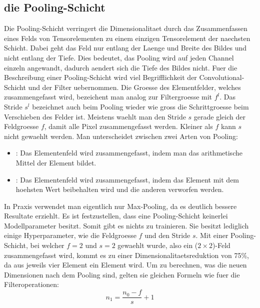 \subsection{die Pooling-Schicht}
Die Pooling-Schicht verringert die Dimensionalitaet durch das Zusammenfassen eines Felds
von Tensorelementen zu einem einzigen Tensorelement der naechsten Schicht.
Dabei geht das Feld nur entlang der Laenge und Breite des Bildes und
nicht entlang der Tiefe. Dies bedeutet, das Pooling wird auf jeden Channel
einzeln angewandt, dadurch aendert sich die Tiefe des Bildes nicht.
\para{}
Fuer die Beschreibung einer Pooling-Schicht wird viel Begrifflichkeit der
Convolutional-Schicht und der Filter uebernommen.
Die Groesse des Elementfelder, welches zusammengefasst wird, bezeichent man analog zur
Filtergroesse mit $f^l$. Das Stride $s^l$ bezeichnet auch beim Pooling wieder wie
gross die Schrittgroesse beim Verschieben des Felder ist. Meistens waehlt man den
Stride $s$ gerade gleich der Feldgroesse $f$, damit alle Pixel
zusammengefasst werden. Kleiner als $f$ kann $s$ nicht gewaehlt werden.
\para{}
Man unterscheidet zwischen zwei Arten von Pooling:
\begin{itemize}
\item{: Das Elementenfeld wird zusammengefasst, indem
    man das arithmetische Mittel der Element bildet.}
\item{: Das Elementenfeld wird zusammengefasst, indem das
    Element mit dem hoehsten Wert beibehalten wird und die anderen verworfen werden.}
\end{itemize}
In Praxis verwendet man eigentlich nur Max-Pooling, da es deutlich bessere
Resultate erziehlt.
\para{}
Es ist festzustellen, dass eine Pooling-Schicht keinerlei Modellparameter
besitzt. Somit gibt es nichts zu trainieren. Sie besitzt lediglich einige
Hyperparameter, wie die Feldgroesse $f$ und den Stride $s$.
\para{}
Mit einer Pooling-Schicht, bei welcher $f = 2$ und $s = 2$ gewaehlt wurde, also
ein ($2 \times 2$)-Feld zusammengefasst wird, kommt es zu einer
Dimensionalitaetsreduktion von 75\%, da aus jeweils vier Element ein Element wird.
\para{}
Um zu berechnen, was die neuen Dimensionen nach dem Pooling sind, gelten sie
gleichen Formeln wie fuer die Filteroperationen:
\\
\begin{equation}
  n_1 = \frac{n_0 - f}{s} + 1
\end{equation}
\\

